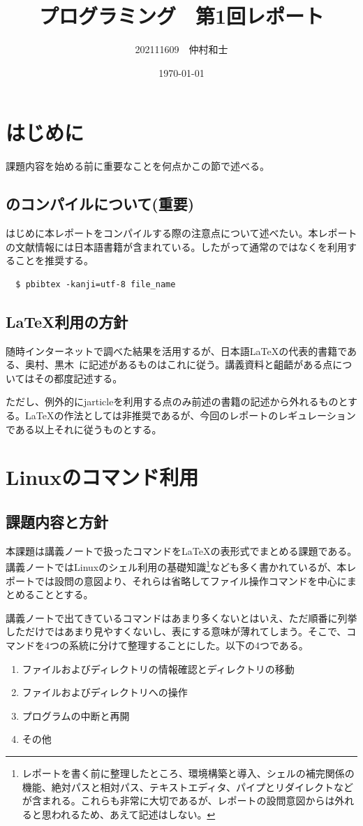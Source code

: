 \documentclass[dvipdfmx,12pt,a4j]{jarticle}
\title{プログラミング　第1回レポート}
\author{202111609　仲村和士}
\date{\today}
\begin{document}
\maketitle
\section{はじめに}
課題内容を始める前に重要なことを何点かこの節で述べる。

\subsection{\BibTeX のコンパイルについて(重要)}
はじめに本レポートをコンパイルする際の注意点について述べたい。本レポートの文献情報には日本語書籍が含まれている。したがって通常の\BibTeX ではなく\pBibTeX を利用することを推奨する。
\begin{verbatim}
  $ pbibtex -kanji=utf-8 file_name
\end{verbatim}

\subsection{\LaTeX 利用の方針}
随時インターネットで調べた結果を活用するが、日本語\LaTeX の代表的書籍である、奥村、黒木~\cite{bibunsho}に記述があるものはこれに従う。講義資料と齟齬がある点についてはその都度記述する。

ただし、例外的にjarticleを利用する点のみ前述の書籍の記述から外れるものとする。\LaTeX の作法としては非推奨であるが、今回のレポートのレギュレーションである以上それに従うものとする。

\section{Linuxのコマンド利用}
\subsection{課題内容と方針}
本課題は講義ノートで扱ったコマンドを\LaTeX の表形式でまとめる課題である。講義ノートではLinuxのシェル利用の基礎知識\footnote{レポートを書く前に整理したところ、環境構築と導入、シェルの補完関係の機能、絶対パスと相対パス、テキストエディタ、パイプとリダイレクトなどが含まれる。これらも非常に大切であるが、レポートの設問意図からは外れると思われるため、あえて記述はしない。}なども多く書かれているが、本レポートでは設問の意図より、それらは省略してファイル操作コマンドを中心にまとめることとする。

講義ノートで出てきているコマンドはあまり多くないとはいえ、ただ順番に列挙しただけではあまり見やすくないし、表にする意味が薄れてしまう。そこで、コマンドを4つの系統に分けて整理することにした。以下の4つである。
\begin{enumerate}
  \item ファイルおよびディレクトリの情報確認とディレクトリの移動
  \item ファイルおよびディレクトリへの操作
  \item プログラムの中断と再開
  \item その他
\end{enumerate}
\end{document}
